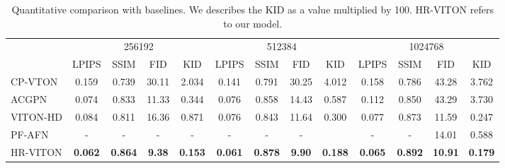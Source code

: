 \begin{comment}
\renewcommand{\arraystretch}{1.5}
\begin{table}
  \begin{center}
      \begin{tabular}{p{0.3\textwidth} p{0.3\textwidth} | p{0.1\textwidth} p{0.1\textwidth}@{}}
        \hline
        \hfil Condition Aligning     &  \hfil Feature Fusion Block        & \hfil FID &  \hfil KID  \\
        \hline
        \                &   \               & \hfil 12.73 & \hfil 0.415 \\
        \cline{3-4}
        \hfil \checkmark  &                 & \hfil 12.41 & \hfil 0.381 \\
        \cline{3-4}
                          & \hfil \checkmark & \hfil 12.05 & \hfil 0.356 \\
        \cline{3-4}
        \hfil \checkmark  & \hfil \checkmark & \hfil \textbf{10.91} & \hfil \textbf{0.179} \\
        \hline
      \end{tabular}
    \caption{Ablation study in unpaired setting. We describes the KID as a value multiplied by 100.}
    \label{table:ablation}
  \end{center}
\end{table}
\renewcommand{\arraystretch}{1}
\end{comment}
\begin{table}[]
\centering
\scriptsize
\begin{tabular}{l|cccc|cccc|cccc}
    \toprule
     & \multicolumn{4}{c}{256192} & \multicolumn{4}{c}{512384} & \multicolumn{4}{c}{1024768}\\ 
& LPIPS & SSIM & FID & KID & LPIPS & SSIM & FID & KID & LPIPS & SSIM & FID & KID \\ 
    \midrule
    CP-VTON  & 0.159 & 0.739 & 30.11 & 2.034 
             & 0.141 & 0.791 & 30.25 & 4.012
             & 0.158 & 0.786 & 43.28 & 3.762
             \\
    ACGPN    & 0.074 & 0.833 & 11.33 & 0.344
             & 0.076 & 0.858 & 14.43 & 0.587
             & 0.112 & 0.850 & 43.29 & 3.730
             \\
    VITON-HD & 0.084 & 0.811 & 16.36 & 0.871
             & 0.076 & 0.843 & 11.64 & 0.300
             & 0.077 & 0.873 & 11.59 & 0.247
             \\
    PF-AFN & - & - & - & -
             & - & - & - &
             & - & - & 14.01 & 0.588
             \\
    \midrule
    HR-VITON    & \textbf{0.062} & \textbf{0.864} & \textbf{9.38} & \textbf{0.153}   
             & \textbf{0.061} & \textbf{0.878} & \textbf{9.90} & \textbf{0.188}
             & \textbf{0.065} & \textbf{0.892} & \textbf{10.91} & \textbf{0.179}
             \\ 
    \bottomrule
\end{tabular}
\caption{Quantitative comparison with baselines. 
         We describes the KID as a value multiplied by 100. HR-VITON refers to our model.}
\label{table:main}
\end{table}

